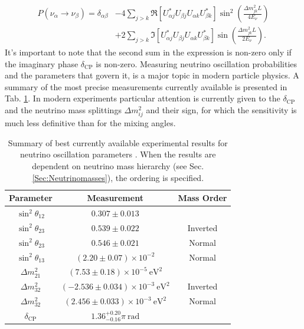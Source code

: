 \begin{equation}
\begin{aligned}   
\label{eq:3fosc_proper}
    P(\nu_\alpha \rightarrow \nu_\beta) = \delta_{\alpha\beta} &
    -4 \sum_{j>k}\Re\left[U_{\alpha j}^*U_{\beta j}U_{\alpha k}U_{\beta k}^*\right]\sin^2\left(\frac{\Delta m^2_{jk}L}{4E_\nu}\right) \\
    & +2 \sum_{j>k}\Im\left[U_{\alpha j}^*U_{\beta j}U_{\alpha k}U_{\beta k}^*\right]\sin\left(\frac{\Delta m^2_{jk}L}{2E_\nu}\right) .
\end{aligned}
\end{equation}
It's important to note that the second sum in the expression is non-zero only if the imaginary phase $\delta_\text{CP}$ is non-zero. Measuring neutrino oscillation probabilities and the parameters that govern it, is a major topic in modern particle physics. A summary of the most precise measurements currently available is presented in Tab. \ref{tab:OscProps}. In modern experiments particular attention is currently given to the $\delta_\text{CP}$ and the neutrino mass splittings $\Delta m_{ij}^2$ and their sign, for which the sensitivity is much less definitive than for the mixing angles.

\begin{table}
    \centering
    \begin{tabular}{||c|c|c||}
    \hline 
    Parameter & Measurement & Mass Order \\ 
    \hline \hline
    $\sin^2 \theta_{12}$ & 
    $0.307 \pm 0.013$ & \\
    \hline
    $\sin^2 \theta_{23}$ & 
    $0.539 \pm 0.022$ &  Inverted\\
    \hline
    $\sin^2 \theta_{23}$ & 
    $0.546 \pm 0.021$ &  Normal\\
    \hline
    $\sin^2 \theta_{13}$ & 
    $(2.20 \pm 0.07)\times 10^{-2}$ &  Normal\\
    \hline
    $\Delta m_{21}^2$ & 
    $(7.53 \pm 0.18)\times 10^{-5} \ \text{eV}^2$ &  \\
    \hline
    $\Delta m_{32}^2$ & 
    $(-2.536 \pm 0.034)\times 10^{-3} \ \text{eV}^2$ &  Inverted\\
    \hline
    $\Delta m_{32}^2$ & 
    $(2.456 \pm 0.033)\times 10^{-3} \ \text{eV}^2$ &  Normal\\
    \hline
    $\delta_\text{CP}$ & 
    $1.36^{+0.20}_{-0.16}\pi \ \text{rad}$ &  \\
    \hline 
    \end{tabular}
    \caption{Summary of best currently available experimental results for neutrino oscillation parameters \cite{ParticleDataGroup:2022pth}. When the results are dependent on neutrino mass hierarchy (see Sec. \ref{Sec:Neutrinomasses}), the ordering is specified.}
    \label{tab:OscProps}
\end{table}

